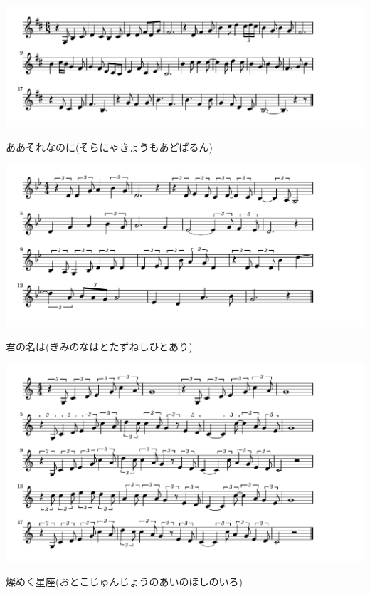 \documentclass[a4paper]{ltjsarticle}
\begin{document}
\includegraphics[clip]{aasorenanoni_crop.pdf}

\vspace{-10mm} \hspace{10mm}
ああそれなのに(そらにゃきょうもあどばるん)

\includegraphics[clip]{kiminonawa_crop.pdf}

\vspace{-10mm} \hspace{10mm}
君の名は(きみのなはとたずねしひとあり)

\includegraphics[clip]{kirameku_crop.pdf}

\vspace{-10mm} \hspace{10mm}
燦めく星座(おとこじゅんじょうのあいのほしのいろ)
\end{document}
